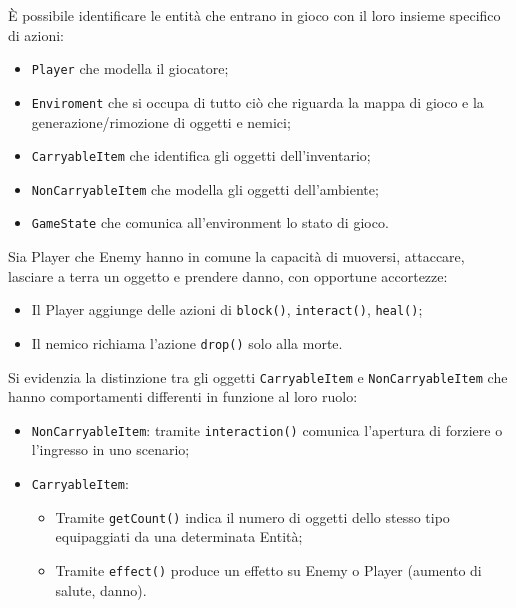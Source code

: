 \documentclass[a4paper, italian, 11pt, oneside]{report}
\begin{document}
È possibile identificare le entità che entrano in gioco con il loro insieme specifico di azioni:
\begin{itemize}
  \item \texttt{Player} che modella il giocatore;
  \item \texttt{Enviroment} che si occupa di tutto ciò che riguarda la mappa di gioco e la generazione/rimozione di oggetti e nemici;
  \item \texttt{CarryableItem} che identifica gli oggetti dell'inventario;
  \item \texttt{NonCarryableItem} che modella gli oggetti dell'ambiente;
  \item \texttt{GameState} che comunica all'environment lo stato di gioco.
\end{itemize}

Sia Player che Enemy hanno in comune la capacità di muoversi, attaccare, lasciare a terra un oggetto e prendere danno, con opportune accortezze:
\begin{itemize}
  \item Il Player aggiunge delle azioni di \texttt{block()}, \texttt{interact()}, \texttt{heal()};
  \item Il nemico richiama l'azione \texttt{drop()} solo alla morte.
\end{itemize}
Si evidenzia la distinzione tra gli oggetti \texttt{CarryableItem} e \texttt{NonCarryableItem} che hanno comportamenti differenti in funzione al loro ruolo:
\begin{itemize}
  \item \texttt{NonCarryableItem}: tramite \texttt{interaction()} comunica l'apertura di forziere o l'ingresso in uno scenario;
  \item \texttt{CarryableItem}: 
  \begin{itemize}
    \item Tramite \texttt{getCount()} indica il numero di oggetti dello stesso tipo equipaggiati da una determinata Entità;
    \item Tramite \texttt{effect()} produce un effetto su Enemy o Player (aumento di salute, danno).
  \end{itemize}
\end{itemize}
\end{document}
